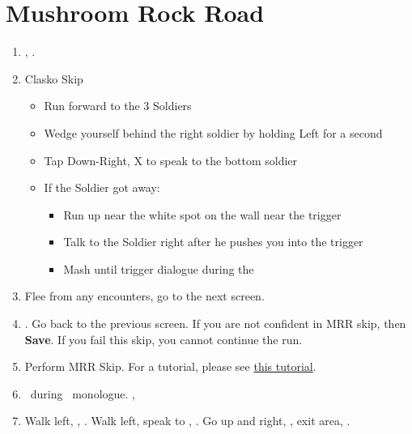 \chapter{Mushroom Rock Road}

\begin{enumerate}
    \item \sd, \cs.
    \item Clasko Skip
    \begin{itemize}
        \item Run forward to the 3 Soldiers
        \item Wedge yourself behind the right soldier by holding Left for a second
        \item Tap Down-Right, X to speak to the bottom soldier
        \item If the Soldier got away:
        \begin{itemize}
            \item Run up near the white spot on the wall near the trigger
            \item Talk to the Soldier right after he pushes you into the trigger
            \item Mash until trigger dialogue during the \cs
        \end{itemize}
    \end{itemize}
    \item Flee from any encounters, go to the next screen.
    \item \save. Go back to the previous screen. If you are not confident in MRR skip, then \textbf{Save}. If you fail this skip, you cannot continue the run.
    \item Perform MRR Skip. For a tutorial, please see \href{https://www.youtube.com/watch?v=SSnxE6Xzvkk}{this tutorial}.
    \item \sd\ during \tidus\ monologue. \cs[1:00], \sd
    \item Walk left, \save, \sd. Walk left, speak to \auron, \sd. Go up and right, \sd, exit area, \sd.
\end{enumerate}
\bothvfill\winvfill\lossvfill
\ 
\bothcb\wincb\losscb
